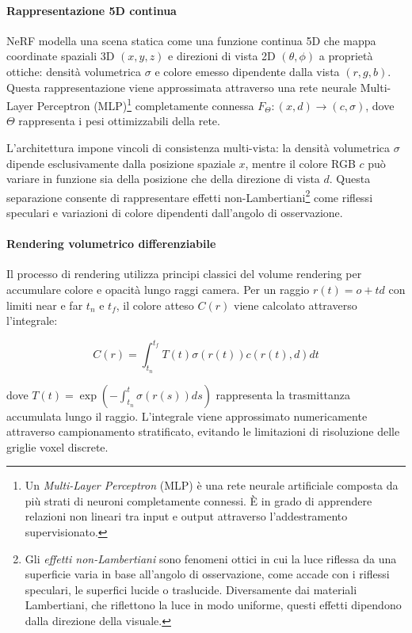 \paragraph{Rappresentazione 5D continua}
NeRF modella una scena statica come una funzione continua 5D che mappa coordinate spaziali 3D $(x, y, z)$ e direzioni di vista 2D $(\theta, \phi)$ a proprietà ottiche: densità volumetrica $\sigma$ e colore emesso dipendente dalla vista $(r, g, b)$. Questa rappresentazione viene approssimata attraverso una rete neurale Multi-Layer Perceptron (MLP)\footnote{Un \textit{Multi-Layer Perceptron} (MLP) è una rete neurale artificiale composta da più strati di neuroni completamente connessi. È in grado di apprendere relazioni non lineari tra input e output attraverso l'addestramento supervisionato.} completamente connessa $F_\Theta : (x, d) \rightarrow (c, \sigma)$, dove $\Theta$ rappresenta i pesi ottimizzabili della rete.

L'architettura impone vincoli di consistenza multi-vista: la densità volumetrica $\sigma$ dipende esclusivamente dalla posizione spaziale $x$, mentre il colore RGB $c$ può variare in funzione sia della posizione che della direzione di vista $d$. Questa separazione consente di rappresentare effetti non-Lambertiani\footnote{Gli \textit{effetti non-Lambertiani} sono fenomeni ottici in cui la luce riflessa da una superficie varia in base all’angolo di osservazione, come accade con i riflessi speculari, le superfici lucide o traslucide. Diversamente dai materiali Lambertiani, che riflettono la luce in modo uniforme, questi effetti dipendono dalla direzione della visuale.} come riflessi speculari e variazioni di colore dipendenti dall'angolo di osservazione.

\paragraph{Rendering volumetrico differenziabile}
Il processo di rendering utilizza principi classici del volume rendering per accumulare colore e opacità lungo raggi camera. Per un raggio $r(t) = o + td$ con limiti near e far $t_n$ e $t_f$, il colore atteso $C(r)$ viene calcolato attraverso l'integrale:

\begin{equation}
	C(r) = \int_{t_n}^{t_f} T(t)\sigma(r(t))c(r(t), d)dt
\end{equation}

dove $T(t) = \exp(-\int_{t_n}^{t} \sigma(r(s))ds)$ rappresenta la trasmittanza accumulata lungo il raggio. L'integrale viene approssimato numericamente attraverso campionamento stratificato, evitando le limitazioni di risoluzione delle griglie voxel discrete.

